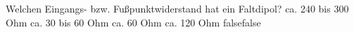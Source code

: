     {Welchen Eingangs- bzw. Fußpunktwiderstand hat ein Faltdipol?}
    {ca. 240 bis 300 Ohm}
    {ca. 30 bis 60 Ohm}
    {ca. 60 Ohm}
    {ca. 120 Ohm}
    {false}{false}